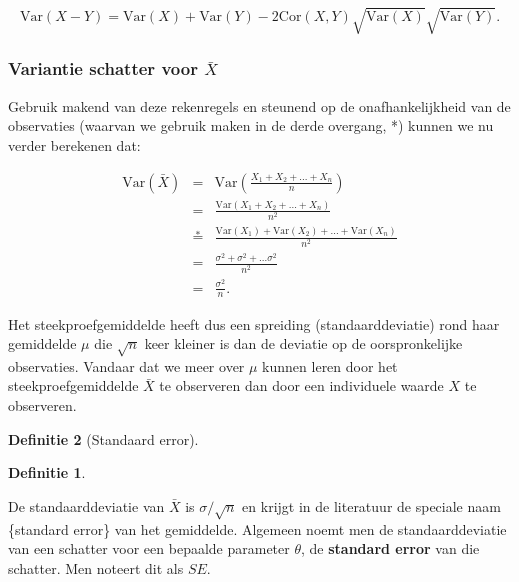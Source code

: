 \documentclass[
  12pt,dutch,coursenotes]{book}
\theoremstyle{definition}
\newtheorem{definition}{Definitie}[chapter]
\theoremstyle{definition}
\theoremstyle{definition}
\theoremstyle{remark}
\begin{document}
\begin{equation*}
\text{Var}(X-Y) = \text{Var}(X) + \text{Var}(Y) -2{\text{Cor}}(X,Y)\sqrt{\text{Var}(X)}\sqrt{\text{Var}(Y)}.
\end{equation*}

\hypertarget{variantie-schatter-voor-bar-x}{%
\subsubsection{\texorpdfstring{Variantie schatter voor \(\bar X\)}{Variantie schatter voor \textbackslash bar X}}\label{variantie-schatter-voor-bar-x}}

Gebruik makend van deze rekenregels en steunend
op de onafhankelijkheid van de observaties (waarvan we gebruik maken in de
derde overgang, *) kunnen we nu verder berekenen dat:

\begin{eqnarray*}
\text{Var}(\bar X)&=&\text{Var} \left(\frac{X_1+ X_2+ ... + X_n}{n}\right) \\
&= & \frac{\text{Var} (X_1+ X_2+ ... + X_n)}{n^2} \\
&\overset{*}{=} & \frac{\text{Var}(X_1)+ \text{Var}(X_2)+ ... + \text{Var}(X_n)}{n^2} \\
&=& \frac{\sigma^2 + \sigma^2 + ... \sigma^2}{n^2} \\
&= & \frac{\sigma^2}{n}.
\end{eqnarray*}

Het steekproefgemiddelde heeft dus een spreiding (standaarddeviatie) rond
haar gemiddelde \(\mu\) die \(\sqrt{n}\) keer kleiner is dan de deviatie op de
oorspronkelijke observaties. Vandaar dat we meer over \(\mu\) kunnen leren
door het steekproefgemiddelde \(\bar X\) te observeren dan door een
individuele waarde \(X\) te observeren.

\begin{definition}[Standaard error]
\begin{definition}

\protect\hypertarget{def:unnamed-chunk-130}{}{\label{def:unnamed-chunk-130} \iffalse (Standaard error) \fi{} }

\end{definition}
\end{definition}

De standaarddeviatie van \(\bar{X}\) is \(\sigma/\sqrt{n}\) en krijgt in de literatuur de speciale naam \{standard error\} van
het gemiddelde. Algemeen noemt men de standaarddeviatie van een schatter
voor een bepaalde parameter \(\theta\), de \textbf{standard error} van die
schatter. Men noteert dit als \(SE\).
\end{document}

